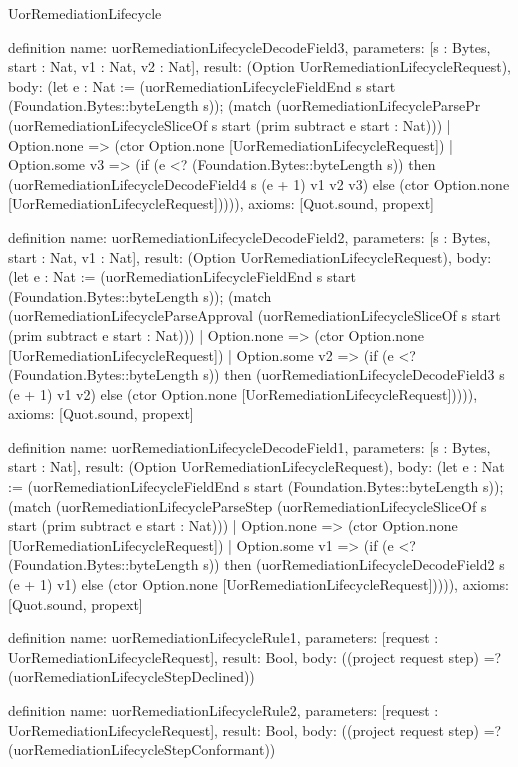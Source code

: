 \begin{lexlean}{UorRemediationLifecycle}
\begin{semanticmodule}
definition{
  name: uorRemediationLifecycleDecodeField3,
  parameters: [s : Bytes, start : Nat, v1 : Nat, v2 : Nat],
  result: (Option UorRemediationLifecycleRequest),
  body: (let e : Nat := (uorRemediationLifecycleFieldEnd s start (Foundation.Bytes::byteLength s)); (match (uorRemediationLifecycleParsePr (uorRemediationLifecycleSliceOf s start (prim subtract e start : Nat)))
    | Option.none => (ctor Option.none [UorRemediationLifecycleRequest])
    | Option.some v3 => (if (e <? (Foundation.Bytes::byteLength s)) then (uorRemediationLifecycleDecodeField4 s (e + 1) v1 v2 v3) else (ctor Option.none [UorRemediationLifecycleRequest])))),
  axioms: [Quot.sound, propext]
}

definition{
  name: uorRemediationLifecycleDecodeField2,
  parameters: [s : Bytes, start : Nat, v1 : Nat],
  result: (Option UorRemediationLifecycleRequest),
  body: (let e : Nat := (uorRemediationLifecycleFieldEnd s start (Foundation.Bytes::byteLength s)); (match (uorRemediationLifecycleParseApproval (uorRemediationLifecycleSliceOf s start (prim subtract e start : Nat)))
    | Option.none => (ctor Option.none [UorRemediationLifecycleRequest])
    | Option.some v2 => (if (e <? (Foundation.Bytes::byteLength s)) then (uorRemediationLifecycleDecodeField3 s (e + 1) v1 v2) else (ctor Option.none [UorRemediationLifecycleRequest])))),
  axioms: [Quot.sound, propext]
}

definition{
  name: uorRemediationLifecycleDecodeField1,
  parameters: [s : Bytes, start : Nat],
  result: (Option UorRemediationLifecycleRequest),
  body: (let e : Nat := (uorRemediationLifecycleFieldEnd s start (Foundation.Bytes::byteLength s)); (match (uorRemediationLifecycleParseStep (uorRemediationLifecycleSliceOf s start (prim subtract e start : Nat)))
    | Option.none => (ctor Option.none [UorRemediationLifecycleRequest])
    | Option.some v1 => (if (e <? (Foundation.Bytes::byteLength s)) then (uorRemediationLifecycleDecodeField2 s (e + 1) v1) else (ctor Option.none [UorRemediationLifecycleRequest])))),
  axioms: [Quot.sound, propext]
}

definition{
  name: uorRemediationLifecycleRule1,
  parameters: [request : UorRemediationLifecycleRequest],
  result: Bool,
  body: ((project request step) =? (uorRemediationLifecycleStepDeclined))
}

definition{
  name: uorRemediationLifecycleRule2,
  parameters: [request : UorRemediationLifecycleRequest],
  result: Bool,
  body: ((project request step) =? (uorRemediationLifecycleStepConformant))
}


\end{semanticmodule}
\end{lexlean}
